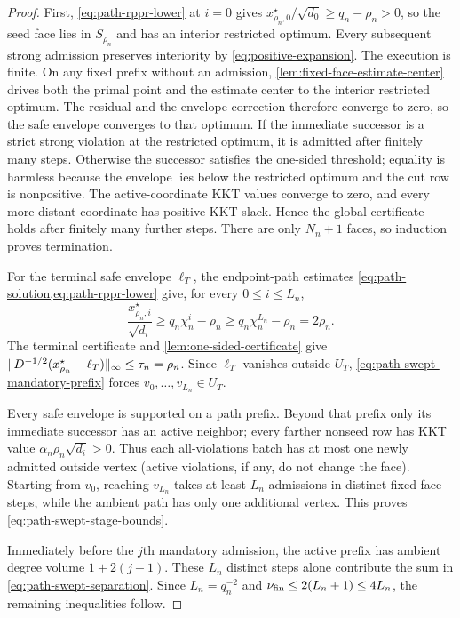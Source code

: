 \begin{proof}
First, \cref{eq:path-rppr-lower} at $i=0$ gives
$x_{\rho_n,0}^\star/\sqrt{d_0}\geq q_n-\rho_n>0$, so the seed face lies in
$S_{\rho_n}$ and has an interior restricted optimum.  Every subsequent
strong admission preserves interiority by \cref{eq:positive-expansion}.
The execution is finite.  On any fixed prefix without an admission,
\cref{lem:fixed-face-estimate-center} drives both the primal point and the
estimate center to the interior restricted optimum.  The residual and the
envelope correction therefore converge to zero, so the safe envelope
converges to that optimum.  If the immediate successor is a strict strong
violation at the restricted optimum, it is admitted after finitely many
steps.  Otherwise the successor satisfies the one-sided threshold; equality
is harmless because the envelope lies below the restricted optimum and the
cut row is nonpositive.  The active-coordinate KKT values converge to zero,
and every more distant coordinate has positive KKT slack.  Hence the global
certificate holds after finitely many further steps.  There are only
$N_n+1$ faces, so induction proves termination.

For the terminal safe envelope $\ell_T$, the endpoint-path estimates
\cref{eq:path-solution,eq:path-rppr-lower} give, for every $0\leq i\leq L_n$,
\begin{equation}
 \frac{x_{\rho_n,i}^\star}{\sqrt{d_i}}
 \geq q_n\chi_n^i-\rho_n
 \geq q_n\chi_n^{L_n}-\rho_n
 =2\rho_n.
 \label{eq:path-swept-mandatory-prefix}
\end{equation}
The terminal certificate and \cref{lem:one-sided-certificate} give
$\lVert D^{-1/2}(x_{\rho_n}^\star-\ell_T)\rVert_\infty\leq\tau_n=\rho_n$.
Since $\ell_T$ vanishes outside $U_T$, \cref{eq:path-swept-mandatory-prefix}
forces $v_0,\ldots,v_{L_n}\in U_T$.

Every safe envelope is supported on a path prefix.  Beyond that prefix only
its immediate successor has an active neighbor; every farther nonseed row has
KKT value $\alpha_n\rho_n\sqrt{d_i}>0$.  Thus each all-violations batch has at
most one newly admitted outside vertex (active violations, if any, do not
change the face).  Starting from $v_0$, reaching $v_{L_n}$ takes at least
$L_n$ admissions in distinct fixed-face steps, while the ambient path has
only one additional vertex.  This proves \cref{eq:path-swept-stage-bounds}.

Immediately before the $j$th mandatory admission, the active prefix has
ambient degree volume $1+2(j-1)$.  These $L_n$ distinct steps alone contribute
the sum in \cref{eq:path-swept-separation}.  Since $L_n=q_n^{-2}$ and
$\nu_{\rm fin}\leq2(L_n+1)\leq4L_n$, the remaining inequalities follow.


\end{proof}
